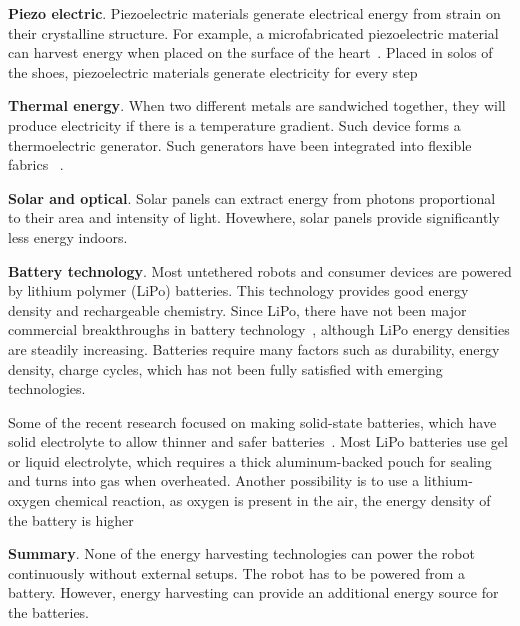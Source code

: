 \textbf{Piezo electric}. 
Piezoelectric materials generate electrical energy from strain on their crystalline structure. For example, a microfabricated piezoelectric material can harvest energy when placed on the surface of the heart~\cite{dagdeviren2014conformal}. Placed in solos of the shoes, piezoelectric materials generate electricity for every step~\cite{shenck2001energy}

\textbf{Thermal energy}. When two different metals are sandwiched together, they will produce electricity if there is a temperature gradient. Such device forms a thermoelectric generator. Such generators have been integrated into flexible fabrics ~\cite{kim2014wearable}. 

\textbf{Solar and optical}. 
Solar panels can extract energy from photons proportional to their area and intensity of light.  Hovewhere, solar panels provide significantly less energy indoors. 

\textbf{Battery technology}. Most untethered robots and consumer devices are powered by lithium polymer (LiPo) batteries. This technology provides good energy density and rechargeable chemistry. Since LiPo, there have not been major commercial breakthroughs in battery technology~\cite{van2014rechargeable}, although LiPo energy densities are steadily increasing. Batteries require many factors such as durability, energy density, charge cycles, which has not been fully satisfied with emerging technologies. 

Some of the recent research focused on making solid-state batteries, which have solid electrolyte to allow thinner and safer batteries~\cite{manthiram2017lithium}. Most LiPo batteries use gel or liquid electrolyte, which requires a thick aluminum-backed pouch for sealing and turns into gas when overheated. Another possibility is to use a lithium-oxygen chemical reaction, as oxygen is present in the air, the energy density of the battery is higher~\cite{jung2012improved} 

\textbf{Summary}. 
None of the energy harvesting technologies can power the robot continuously without external setups. The robot has to be powered from a battery.  However, energy harvesting can provide an additional energy source for the batteries.  

